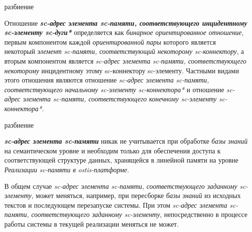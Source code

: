 \begin{SCn}
\begin{scnrelfromset}{разбиение}
\end{scnrelfromset}
\end{SCn}

Отношение \textbf{\textit{sc-адрес элемента sc-памяти, соответствующего инцидентному sc-элементу sc-дуги*}} определяется как \textit{бинарное ориентированное отношение}, первым компонентом каждой \textit{ориентированной пары} которого является некоторый \textit{элемент sc-памяти, соответствующий некоторому sc-коннектору}, а вторым компонентом является \textit{sc-адрес элемента sc-памяти, соответствующего некоторому} инцидентному этому sc-коннектору {sc-элементу}. Частными видами этого отношения являются отношение \textit{sc-адрес элемента sc-памяти, соответствующего начальному sc-элементу sc-коннектора*} и отношение \textit{sc-адрес элемента sc-памяти, соответствующего конечному sc-элементу sc-коннектора*}.

\begin{SCn}
\begin{scnrelfromset}{разбиение}
\end{scnrelfromset}
\end{SCn}

\textbf{\textit{sc-адрес элемента sc-памяти}} никак не учитывается при обработке \textit{базы знаний} на семантическом уровне и необходим только для обеспечения доступа к соответствующей структуре данных, хранящейся в линейной памяти на уровне \textit{Реализации sc-памяти в ostis-платформе}.

В общем случае \textit{sc-адрес элемента sc-памяти, соответствующего заданному sc-элементу}, может меняться, например, при пересборке \textit{базы знаний} из исходных текстов и последующем перезапуске системы. При этом \textit{sc-адрес элемента sc-памяти, соответствующего заданному sc-элементу}, непосредственно в процессе работы системы в текущей реализации меняться не может.

